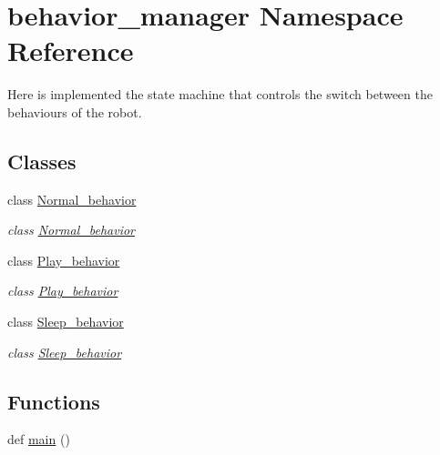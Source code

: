 \hypertarget{namespacebehavior__manager}{}\section{behavior\+\_\+manager Namespace Reference}
\label{namespacebehavior__manager}


Here is implemented the state machine that controls the switch between the behaviours of the robot.  


\subsection*{Classes}
\begin{DoxyCompactItemize}
\item 
class \hyperlink{classbehavior__manager_1_1Normal__behavior}{Normal\+\_\+behavior}
\begin{DoxyCompactList}\small\item\em class \hyperlink{classbehavior__manager_1_1Normal__behavior}{Normal\+\_\+behavior} \end{DoxyCompactList}\item 
class \hyperlink{classbehavior__manager_1_1Play__behavior}{Play\+\_\+behavior}
\begin{DoxyCompactList}\small\item\em class \hyperlink{classbehavior__manager_1_1Play__behavior}{Play\+\_\+behavior} \end{DoxyCompactList}\item 
class \hyperlink{classbehavior__manager_1_1Sleep__behavior}{Sleep\+\_\+behavior}
\begin{DoxyCompactList}\small\item\em class \hyperlink{classbehavior__manager_1_1Sleep__behavior}{Sleep\+\_\+behavior} \end{DoxyCompactList}\end{DoxyCompactItemize}
\subsection*{Functions}
\begin{DoxyCompactItemize}
\item 
def \hyperlink{namespacebehavior__manager_a81416c498199e9a8bc275514afaf9944}{main} ()
\end{DoxyCompactItemize}
